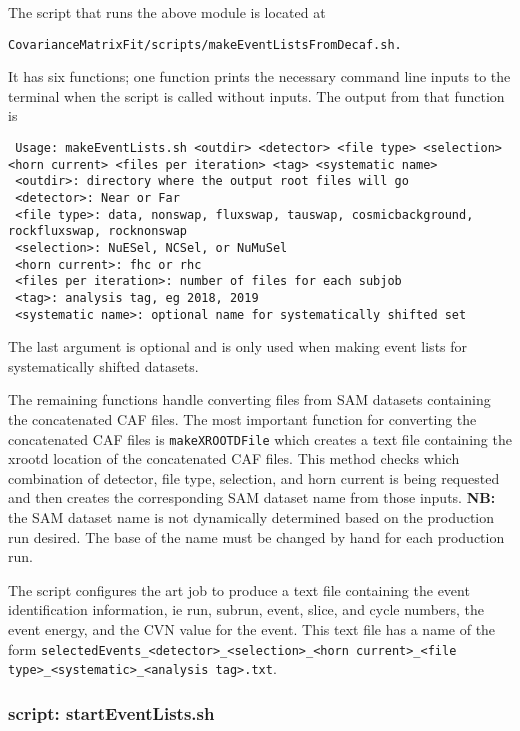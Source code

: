 The script that runs the above module is located at 
\begin{lstlisting}
CovarianceMatrixFit/scripts/makeEventListsFromDecaf.sh.
\end{lstlisting}
It has six functions; one function prints the necessary command line inputs to the terminal when the script is called without inputs.  The output from that function is
\begin{lstlisting}
 Usage: makeEventLists.sh <outdir> <detector> <file type> <selection> <horn current> <files per iteration> <tag> <systematic name>
 <outdir>: directory where the output root files will go
 <detector>: Near or Far
 <file type>: data, nonswap, fluxswap, tauswap, cosmicbackground, rockfluxswap, rocknonswap
 <selection>: NuESel, NCSel, or NuMuSel
 <horn current>: fhc or rhc
 <files per iteration>: number of files for each subjob
 <tag>: analysis tag, eg 2018, 2019
 <systematic name>: optional name for systematically shifted set
\end{lstlisting}
The last argument is optional and is only used when making event lists for systematically shifted datasets.

The remaining functions handle converting files from SAM datasets containing the concatenated CAF files. The most important function for converting the concatenated CAF files is \lstinline{makeXROOTDFile} which creates a text file containing the xrootd location of the concatenated CAF files.  This method checks which combination of detector, file type, selection, and horn current is being requested and then creates the corresponding SAM dataset name from those inputs.  {\bf NB:} the SAM dataset name is not dynamically determined based on the production run desired.  The base of the name must be changed by hand for each production run.

The script configures the art job to produce a text file containing the event identification information, ie run, subrun, event, slice, and cycle numbers, the event energy, and the CVN value for the event.  This text file has a name of the form \lstinline{selectedEvents_<detector>_<selection>_<horn current>_<file type>_<systematic>_<analysis tag>.txt}. 

\subsubsection{script: startEventLists.sh}

